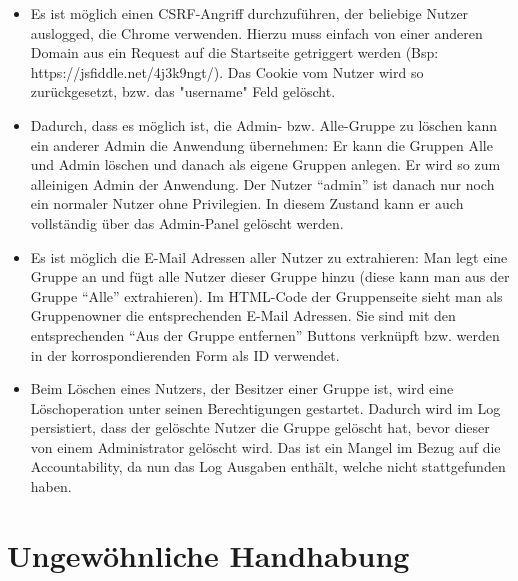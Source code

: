 \documentclass[12pt,DIV14,BCOR10mm,a4paper,parskip=half-,headsepline,headinclude,english,ngerman,bibliography=totocnumbered]{scrreprt}
\begin{document}
\begin{itemize}
\item Es ist möglich einen CSRF-Angriff durchzuführen, der beliebige Nutzer auslogged, die Chrome verwenden. Hierzu muss einfach von einer anderen Domain aus ein Request auf die Startseite getriggert werden (Bsp: https://jsfiddle.net/4j3k9ngt/). Das Cookie vom Nutzer wird so zurückgesetzt, bzw. das "username" Feld gelöscht.
\item Dadurch, dass es möglich ist, die Admin- bzw. Alle-Gruppe zu löschen kann ein anderer Admin die Anwendung übernehmen: Er kann die Gruppen Alle und Admin löschen und danach als eigene Gruppen anlegen. Er wird so zum alleinigen Admin der Anwendung. Der Nutzer \enquote{admin} ist danach nur noch ein normaler Nutzer ohne Privilegien. In diesem Zustand kann er auch vollständig über das Admin-Panel gelöscht werden.
\item Es ist möglich die E-Mail Adressen aller Nutzer zu extrahieren: Man legt eine Gruppe an und fügt alle Nutzer dieser Gruppe hinzu (diese kann man aus der Gruppe \enquote{Alle} extrahieren). Im HTML-Code der Gruppenseite sieht man als Gruppenowner die entsprechenden E-Mail Adressen. Sie sind mit den entsprechenden \enquote{Aus der Gruppe entfernen} Buttons verknüpft bzw. werden in der korrospondierenden Form als ID verwendet.
\item Beim Löschen eines Nutzers, der Besitzer einer Gruppe ist, wird eine Löschoperation unter seinen Berechtigungen gestartet. Dadurch wird im Log persistiert, dass der gelöschte Nutzer die Gruppe gelöscht hat, bevor dieser von einem Administrator gelöscht wird. Das ist ein Mangel im Bezug auf die Accountability, da nun das Log Ausgaben enthält, welche nicht stattgefunden haben.
\end{itemize}

\chapter{Ungewöhnliche Handhabung}
\end{document}
